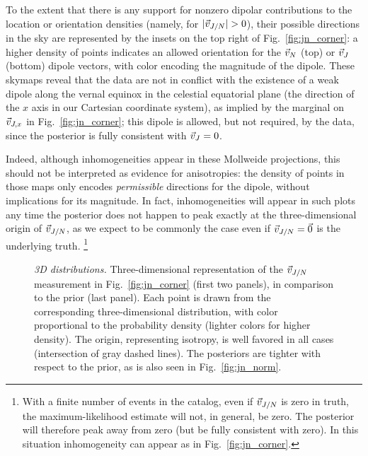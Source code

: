 \documentclass[aps,prd,twocolumn,superscriptaddress,preprintnumbers,floatfix,nofootinbib]{revtex4-2}
\begin{document}
To the extent that there is any support for nonzero dipolar contributions to the location or orientation densities (namely, for $|\vec{v}_{J/N}| > 0$), their possible directions in the sky are represented by the insets on the top right of Fig.~\ref{fig:jn_corner}: a higher density of points indicates an allowed orientation for the $\vec{v}_{N}$ (top) or $\vec{v}_{J}$ (bottom) dipole vectors, with color encoding the magnitude of the dipole.
These skymaps reveal that the data are not in conflict with the existence of a weak dipole along the vernal equinox in the celestial equatorial plane (the direction of the $x$ axis in our Cartesian coordinate system), as implied by the marginal on $\vec{v}_{J,x}$ in Fig.~\ref{fig:jn_corner}; this dipole is allowed, but not required, by the data, since the posterior is fully consistent with $\vec{v}_{J} = 0$.

Indeed, although inhomogeneities appear in these Mollweide projections, this should not be interpreted as evidence for anisotropies: the density of points in those maps only encodes \emph{permissible} directions for the dipole, without implications for its magnitude.
In fact, inhomogeneities will appear in such plots any time the posterior does not happen to peak exactly at the three-dimensional origin of $\vec{v}_{J/N}$, as we expect to be commonly the case even if $\vec{v}_{J/N}=\vec{0}$ is the underlying truth.%
\footnote{With a finite number of events in the catalog, even if $\vec{v}_{J/N}$ is zero in truth, the maximum-likelihood estimate will not, in general, be zero.  The posterior will therefore peak away from zero (but be fully consistent with zero).  In this situation inhomogeneity can appear as in Fig.\ \ref{fig:jn_corner}.}

\begin{figure*}
\caption{\emph{3D distributions.} Three-dimensional representation of the $\vec{v}_{J/N}$ measurement in Fig.~\ref{fig:jn_corner} (first two panels), in comparison to the prior (last panel).
Each point is drawn from the corresponding three-dimensional distribution, with color proportional to the probability density (lighter colors for higher density).
The origin, representing isotropy, is well favored in all cases (intersection of gray dashed lines).
The posteriors are tighter with respect to the prior, as is also seen in Fig.~\ref{fig:jn_norm}.
}
\label{fig:density_3d}
\end{figure*}
\end{document}
